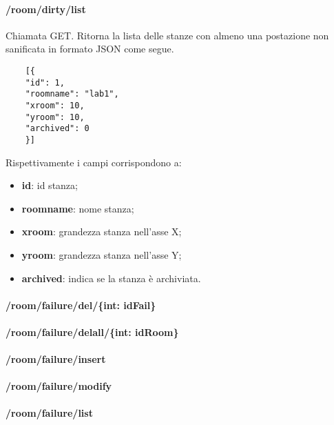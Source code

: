 \paragraph{/room/dirty/list}
Chiamata GET. Ritorna la lista delle stanze con almeno una postazione non sanificata in formato JSON come segue.	\\
\begin{center}
	\begin{lstlisting}
	[{
	"id": 1,
	"roomname": "lab1",
	"xroom": 10,
	"yroom": 10,
	"archived": 0
	}]
	\end{lstlisting}
\end{center}
Rispettivamente i campi corrispondono a:
\begin{itemize}
	\item \textbf{id}: id stanza;
	\item \textbf{roomname}: nome stanza;
	\item \textbf{xroom}: grandezza stanza nell'asse X;
	\item \textbf{yroom}: grandezza stanza nell'asse Y;
	\item \textbf{archived}: indica se la stanza è archiviata.	
\end{itemize}
\paragraph{/room/failure/del/\{int: idFail\}}
\paragraph{/room/failure/delall/\{int: idRoom\}}
\paragraph{/room/failure/insert}
\paragraph{/room/failure/modify}
\paragraph{/room/failure/list}

